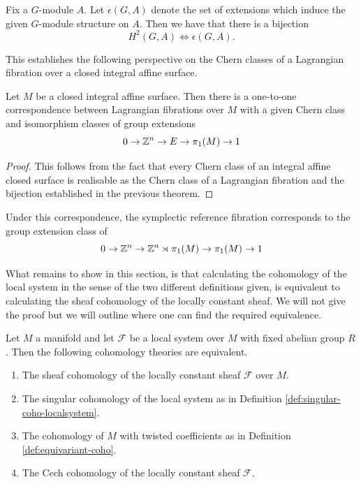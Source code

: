 \begin{theorem}
    Fix a $G$-module $A$. Let $\epsilon(G, A)$ denote the set of extensions which induce the given
    $G$-module structure on $A$. Then we have that there is a bijection
    $$
        H^2(G, A) \iff \epsilon(G, A).
    $$
\end{theorem}

This establishes the following perspective on the Chern classes of a Lagrangian
fibration over a closed integral affine surface.

\begin{prop}
    Let $M$ be a closed integral affine surface. Then there is a one-to-one correspondence between
    Lagrangian fibrations over $M$ with a given Chern class and isomorphism classes of group extensions
    $$
        0 \to \mathbb{Z}^n \to E \to \pi_1(M) \to 1
    $$
\end{prop}
\begin{proof}
    This follows from the fact that every Chern class of an integral affine closed surface is realisable as the Chern class of a Lagrangian fibration and the bijection established in the previous theorem.
\end{proof}

\begin{remark}
    Under this correspondence, the symplectic reference fibration corresponds to the group extension class of
    $$0 \to \mathbb{Z}^n \to \mathbb{Z}^n \rtimes \pi_1(M) \to \pi_1(M) \to 1$$
\end{remark}

What remains to show in this section, is that calculating the cohomology of the
local system in the sense of the two different definitions given, is equivalent
to calculating the sheaf cohomology of the locally constant sheaf. We will not
give the proof but we will outline where one can find the required equivalence.

\begin{theorem}\label{thm:equiv-cohomology-theories}
    Let $M$ a manifold and let $\mathcal{F}$ be a local system over $M$ with fixed abelian group $R$. Then the following cohomology theories are equivalent.
    \begin{enumerate}
        \item The sheaf cohomology of the locally constant sheaf $\mathcal{F}$ over $M$.
        \item The singular cohomology of the local system as in Definition
              \ref{def:singular-coho-localsystem}.
        \item The cohomology of $M$ with twisted coefficients as in Definition
              \ref{def:equivariant-coho}.
        \item The Cech cohomology of the locally constant sheaf $\mathcal{F}$.
    \end{enumerate}
\end{theorem}

